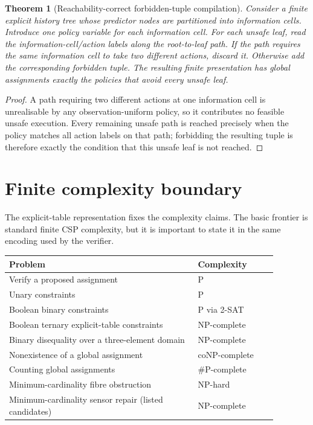 \documentclass[11pt]{article}
\theoremstyle{plain}
\newtheorem{theorem}{Theorem}[section]
\theoremstyle{definition}
\theoremstyle{remark}
\begin{document}
\begin{theorem}[Reachability-correct forbidden-tuple compilation]
Consider a finite explicit history tree whose predictor nodes are partitioned
into information cells.  Introduce one policy variable for each information
cell.  For each unsafe leaf, read the information-cell/action labels along the
root-to-leaf path.  If the path requires the same information cell to take two
different actions, discard it.  Otherwise add the corresponding forbidden tuple.
The resulting finite presentation has global assignments exactly the policies
that avoid every unsafe leaf.
\end{theorem}

\begin{proof}
A path requiring two different actions at one information cell is unrealisable
by any observation-uniform policy, so it contributes no feasible unsafe
execution.  Every remaining unsafe path is reached precisely when the policy
matches all action labels on that path; forbidding the resulting tuple is
therefore exactly the condition that this unsafe leaf is not reached.
\end{proof}

\section{Finite complexity boundary}
\label{sec:complexity}

The explicit-table representation fixes the complexity claims.  The basic
frontier is standard finite CSP complexity, but it is important to state it in
the same encoding used by the verifier.

\begin{center}
\begin{tabular}{@{}p{0.62\linewidth}p{0.26\linewidth}@{}}
\toprule
Problem & Complexity\\
\midrule
Verify a proposed assignment & P\\
Unary constraints & P\\
Boolean binary constraints & P via 2-SAT\\
Boolean ternary explicit-table constraints & NP-complete\\
Binary disequality over a three-element domain & NP-complete\\
Nonexistence of a global assignment & coNP-complete\\
Counting global assignments & \(\#\mathrm P\)-complete\\
Minimum-cardinality fibre obstruction & NP-hard\\
Minimum-cardinality sensor repair (listed candidates) & NP-complete\\
\bottomrule
\end{tabular}
\end{center}
\end{document}
